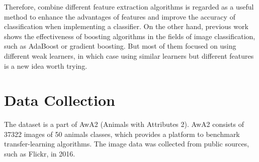 \documentclass[conference]{IEEEtran}
\begin{document}
Therefore, combine different feature extraction algorithms is regarded as a useful method to enhance the advantages of features and improve the accuracy of classification when implementing a classifier. On the other hand, previous work shows the effectiveness of boosting algorithms in the fields of image classification, such as AdaBoost or gradient boosting. But most of them focused on using different weak learners, in which case using similar learners but different features is a new idea worth trying.

\section{Data Collection}
The dataset is a part of AwA2 (Animals with Attributes 2)\cite{dataset}. AwA2 consists of 37322 images of 50 animals classes, which provides a platform to benchmark transfer-learning algorithms. The image data was collected from public sources, such as Flickr, in 2016.
\end{document}
